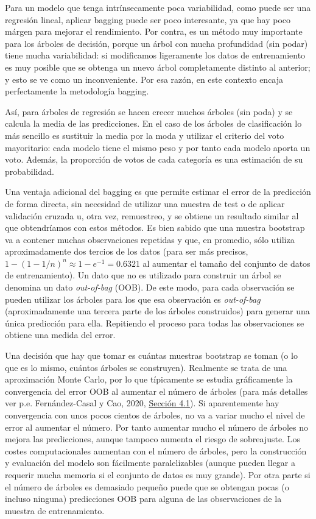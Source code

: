 \documentclass[]{book}
\theoremstyle{break}
\theoremstyle{definition}
\theoremstyle{definition}
\theoremstyle{definition}
\theoremstyle{remark}
\begin{document}
Para un modelo que tenga intrínsecamente poca variabilidad, como puede
ser una regresión lineal, aplicar bagging puede ser poco interesante, ya
que hay poco márgen para mejorar el rendimiento. Por contra, es un
método muy importante para los árboles de decisión, porque un árbol con
mucha profundidad (sin podar) tiene mucha variabilidad: si modificamos
ligeramente los datos de entrenamiento es muy posible que se obtenga un
nuevo árbol completamente distinto al anterior; y esto se ve como un
inconveniente. Por esa razón, en este contexto encaja perfectamente la
metodología bagging.

Así, para árboles de regresión se hacen crecer muchos árboles (sin poda)
y se calcula la media de las predicciones. En el caso de los árboles de
clasificación lo más sencillo es sustituir la media por la moda y
utilizar el criterio del voto mayoritario: cada modelo tiene el mismo
peso y por tanto cada modelo aporta un voto. Además, la proporción de
votos de cada categoría es una estimación de su probabilidad.

Una ventaja adicional del bagging es que permite estimar el error de la
predicción de forma directa, sin necesidad de utilizar una muestra de
test o de aplicar validación cruzada u, otra vez, remuestreo, y se
obtiene un resultado similar al que obtendríamos con estos métodos. Es
bien sabido que una muestra bootstrap va a contener muchas observaciones
repetidas y que, en promedio, sólo utiliza aproximadamente dos tercios
de los datos (para ser más precisos,
\(1 - (1 - 1/n)^n \approx 1 - e^{-1} = 0.6321\) al aumentar el tamaño
del conjunto de datos de entrenamiento). Un dato que no es utilizado
para construir un árbol se denomina un dato \emph{out-of-bag} (OOB). De
este modo, para cada observación se pueden utilizar los árboles para los
que esa observación es \emph{out-of-bag} (aproximadamente una tercera
parte de los árboles construidos) para generar una única predicción para
ella. Repitiendo el proceso para todas las observaciones se obtiene una
medida del error.

Una decisión que hay que tomar es cuántas muestras bootstrap se toman (o
lo que es lo mismo, cuántos árboles se construyen). Realmente se trata
de una aproximación Monte Carlo, por lo que típicamente se estudia
gráficamente la convergencia del error OOB al aumentar el número de
árboles (para más detalles ver p.e. Fernández-Casal y Cao, 2020,
\href{https://rubenfcasal.github.io/simbook/convergencia.html}{Sección
4.1}). Si aparentemente hay convergencia con unos pocos cientos de
árboles, no va a variar mucho el nivel de error al aumentar el número.
Por tanto aumentar mucho el número de árboles no mejora las
predicciones, aunque tampoco aumenta el riesgo de sobreajuste. Los
costes computacionales aumentan con el número de árboles, pero la
construcción y evaluación del modelo son fácilmente paralelizables
(aunque pueden llegar a requerir mucha memoria si el conjunto de datos
es muy grande). Por otra parte si el número de árboles es demasiado
pequeño puede que se obtengan pocas (o incluso ninguna) predicciones OOB
para alguna de las observaciones de la muestra de entrenamiento.
\end{document}
